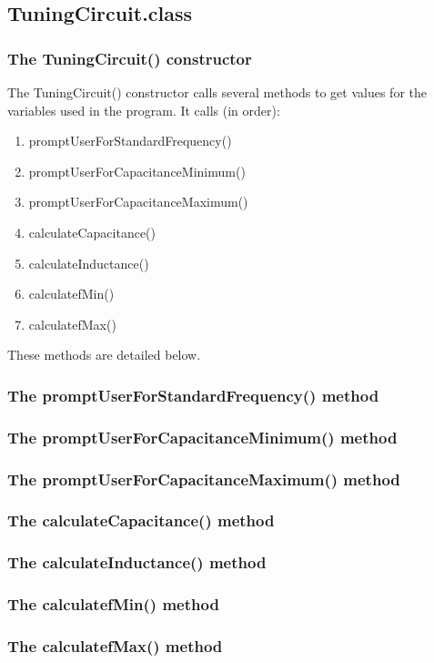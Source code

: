 \documentclass[12pt]{article}
\begin{document}
\subsection{TuningCircuit.class}
\subsubsection{The TuningCircuit() constructor}
The TuningCircuit() constructor calls several methods to get values for the variables used in the program. It calls (in order):
\begin{enumerate}
\item promptUserForStandardFrequency()
\item promptUserForCapacitanceMinimum()
\item promptUserForCapacitanceMaximum()
\item calculateCapacitance()
\item calculateInductance()
\item calculatefMin()
\item calculatefMax()
\end{enumerate}
These methods are detailed below.

\subsubsection{The promptUserForStandardFrequency() method}
\subsubsection{The promptUserForCapacitanceMinimum() method}
\subsubsection{The promptUserForCapacitanceMaximum() method}
\subsubsection{The calculateCapacitance() method}
\subsubsection{The calculateInductance() method}
\subsubsection{The calculatefMin() method}
\subsubsection{The calculatefMax() method}
\end{document}
